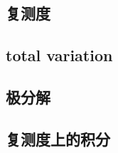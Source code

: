 

\subsection{复测度}
\label{b1:subsec:060501}

\subsection{total variation}
\label{b1:subsec:060502}

\subsection{极分解}
\label{b1:subsec:060503}

\subsection{复测度上的积分}
\label{b1:subsec:060504}


